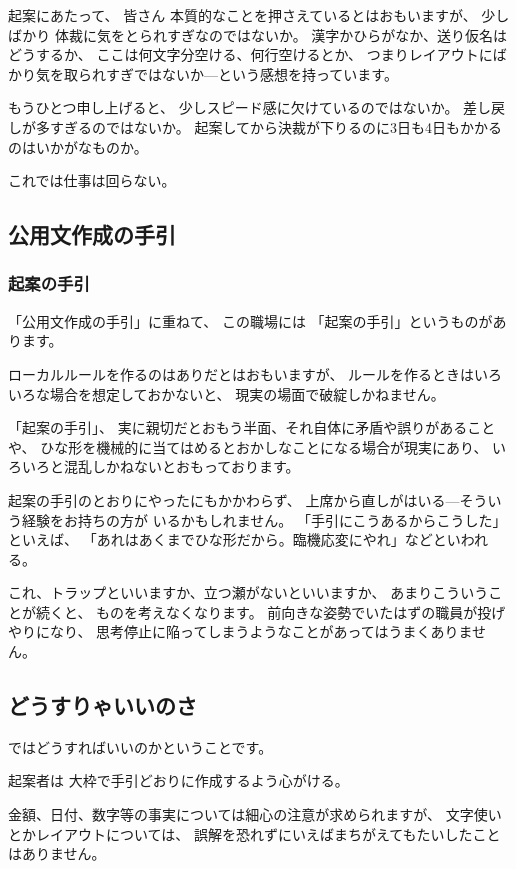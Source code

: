 \documentclass[uplatex,jis2004,dvipdfmx,12pt]{jsarticle}
\begin{document}
起案にあたって、
皆さん
本質的なことを押さえているとはおもいますが、
少しばかり
体裁に気をとられすぎなのではないか。
漢字かひらがなか、送り仮名はどうするか、
ここは何文字分空ける、何行空けるとか、
つまりレイアウトにばかり気を取られすぎではないか---という感想を持っています。

もうひとつ申し上げると、
少しスピード感に欠けているのではないか。
差し戻しが多すぎるのではないか。
起案してから決裁が下りるのに3日も4日もかかるのはいかがなものか。


これでは仕事は回らない。



\subsection{公用文作成の手引}

\subsubsection{起案の手引}
「公用文作成の手引」に重ねて、
この職場には
「起案の手引」というものがあります。


ローカルルールを作るのはありだとはおもいますが、
ルールを作るときはいろいろな場合を想定しておかないと、
現実の場面で破綻しかねません。

「起案の手引」、
実に親切だとおもう半面、それ自体に矛盾や誤りがあることや、
ひな形を機械的に当てはめるとおかしなことになる場合が現実にあり、
いろいろと混乱しかねないとおもっております。

起案の手引のとおりにやったにもかかわらず、
上席から直しがはいる---そういう経験をお持ちの方が
いるかもしれません。
「手引にこうあるからこうした」といえば、
「あれはあくまでひな形だから。臨機応変にやれ」などといわれる。

これ、トラップといいますか、立つ瀬がないといいますか、
あまりこういうことが続くと、
ものを考えなくなります。
前向きな姿勢でいたはずの職員が投げやりになり、
思考停止に陥ってしまうようなことがあってはうまくありません。

\subsection{どうすりゃいいのさ}


ではどうすればいいのかということです。

起案者は
大枠で手引どおりに作成するよう心がける。

金額、日付、数字等の事実については細心の注意が求められますが、
文字使いとかレイアウトについては、
誤解を恐れずにいえばまちがえてもたいしたことはありません。
\end{document}
